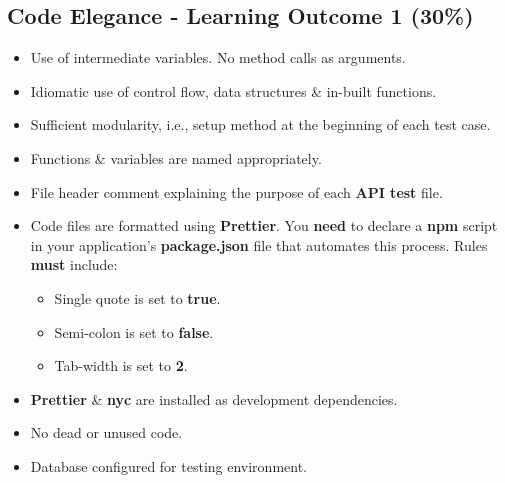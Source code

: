 \documentclass{article}
\begin{document}
\subsection*{Code Elegance - Learning Outcome 1 (30\%)}
\begin{itemize}
  \item Use of intermediate variables. No method calls as arguments.
  \item Idiomatic use of control flow, data structures \& in-built functions.
  \item Sufficient modularity, i.e., setup method at the beginning of each test case.
  \item Functions \& variables are named appropriately.
  \item File header comment explaining the purpose of each \textbf{API test} file.
  \item Code files are formatted using \textbf{Prettier}. You \textbf{need} to declare a \textbf{npm} script in your application's \textbf{package.json} file that automates this process. Rules \textbf{must} include:
        \begin{itemize}
          \item Single quote is set to \textbf{true}.
          \item Semi-colon is set to \textbf{false}.
          \item Tab-width is set to \textbf{2}.
        \end{itemize}
  \item \textbf{Prettier} \& \textbf{nyc} are installed as development dependencies.
  \item No dead or unused code.
  \item Database configured for testing environment.
\end{itemize}
\end{document}
